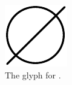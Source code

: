 \begin{figure}[H]
  \centering
  \includegraphics{images/emptySet}
  \caption{The \PD glyph for .}
  \label{fig:emptySet}
\end{figure}

